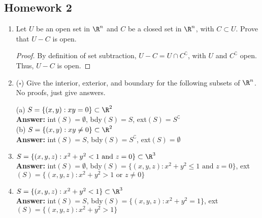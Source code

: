 \documentclass[a5paper]{article}
\theoremstyle{definition}%
\numberwithin{exercise}{section}
\theoremstyle{remark}%
\begin{document}
\subsection{Homework 2}
\begin{enumerate}
\item Let $U$ be an open set in $\R^n$ and $C$ be a closed set in $\R^n$, with $C\subset U$. Prove that $U-C$ is open. 

\begin{proof}
By definition of set subtraction, $U-C=U\cap C^\complement$, with $U$ and $C^\complement$ open. Thus, $U-C$ is open. 
\end{proof}

\item ($\square$) Give the interior, exterior, and boundary for the following subsets of $\R^n$. No proofs, just give answers.

	(a) $S = \{(x,y):xy=0\}\subset\R^2$\\
	\textbf{Answer:} int$(S) = \emptyset$, bdy$(S) = S$, ext$(S) = S^\complement$ 
	\qedwhite\\
	
	(b) $S = \{(x,y):xy\neq0\}\subset\R^2$\\
	\textbf{Answer:} int$(S) = S$, bdy$(S) = S^\complement$, ext$(S) = \emptyset$ 
	\qedwhite\\
	
	\item $S = \{(x,y,z):x^2+y^2<1 \text{ and } z=0\}\subset\R^3$\\
	\textbf{Answer:} int$(S) = \emptyset$, bdy$(S) = \{(x,y,z):x^2+y^2\leq1 \text{ and } z=0\}$, ext$(S) = \{(x,y,z):x^2+y^2>1 \text{ or } z\neq0\}$ 
	\qedwhite\\
	
	\item $S = \{(x,y,z):x^2+y^2<1\}\subset\R^3$\\
	\textbf{Answer:} int$(S) = S$, bdy$(S) = \{(x,y,z):x^2+y^2=1\}$, ext$(S) = \{(x,y,z):x^2+y^2>1\}$ 
	\qedwhite\\
	

\end{enumerate}
\end{document}
